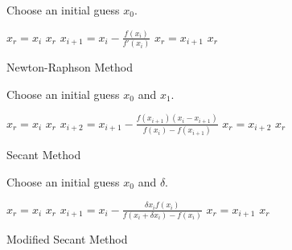 \documentclass[a4,10pt]{article}
\theoremstyle{examplestyle}
\begin{document}
\begin{algorithm}\label{alg:c1}
Choose an initial guess $x_{0}$.
\begin{algorithmic}
    \State $x_{r}=x_{i}$
    \State \Return $x_{r}$
  \EndIf
  \State $x_{i+1}=x_{i}-\frac{f(x_{i})}{f'(x_{i})}$
    \State $x_{r}=x_{i+1}$
    \State \Return $x_{r}$
  \EndIf
\EndFor
\end{algorithmic}
\caption{Newton-Raphson Method}
\end{algorithm}

\begin{algorithm}\label{alg:c2}
Choose an initial guess $x_{0}$ and $x_{1}$.
\begin{algorithmic}
    \State $x_{r}=x_{i}$
    \State \Return $x_{r}$
  \EndIf
  \State $x_{i+2}=x_{i+1}-\frac{f(x_{i+1})(x_{i}-x_{i+1})}{f(x_{i})-f(x_{i+1})}$
    \State $x_{r}=x_{i+2}$
    \State \Return $x_{r}$
  \EndIf
\EndFor
\end{algorithmic}
\caption{Secant Method}
\end{algorithm}

\begin{algorithm}\label{alg:c3}
Choose an initial guess $x_{0}$ and $\delta$.
\begin{algorithmic}
    \State $x_{r}=x_{i}$
    \State \Return $x_{r}$
  \EndIf
  \State $x_{i+1}=x_{i}-\frac{\delta x_{i}f(x_{i})}{f(x_{i}+\delta x_{i})-f(x_{i})}$
    \State $x_{r}=x_{i+1}$
    \State \Return $x_{r}$
  \EndIf
\EndFor
\end{algorithmic}
\caption{Modified Secant Method}
\end{algorithm}
\end{document}
